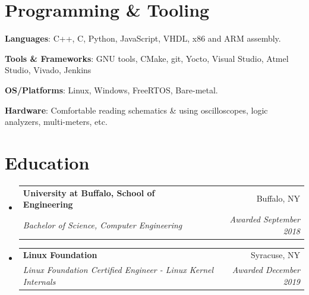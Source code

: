 \documentclass[letterpaper,11pt]{article}
\makeatletter
\newcommand{\resumeSubheading}[4]{
  \vspace{-1pt}\item
    \begin{tabular*}{0.97\textwidth}{l@{\extracolsep{\fill}}r}
      \textbf{#1} & #2 \\
      \textit{\small#3} & \textit{\small #4} \\
    \end{tabular*}\vspace{-5pt}
}
\newcommand{\resumeSubHeadingListStart}{\begin{itemize}[leftmargin=*]}
\newcommand{\resumeSubHeadingListEnd}{\end{itemize}}
\makeatother
\begin{document}
%
\section{Programming \& Tooling}
 \resumeSubHeadingListStart
   \item{
     \textbf{Languages}{: C++, C, Python, JavaScript, VHDL, x86 and ARM assembly.} }
     \hfill
     \item{
      \textbf{Tools \& Frameworks}{: GNU tools, CMake, git, Yocto, Visual Studio, Atmel Studio, Vivado, Jenkins
   } 
\item{
	\textbf{OS/Platforms}{: Linux, Windows, FreeRTOS, Bare-metal.} }
\item {
	\textbf{Hardware}{: Comfortable reading schematics \& using oscilloscopes, logic analyzers, multi-meters, etc.}}

} 
 \resumeSubHeadingListEnd
 
 \section{Education}
 \resumeSubHeadingListStart
 \resumeSubheading
 {University at Buffalo, School of Engineering}{Buffalo, NY}
 {Bachelor of Science, Computer Engineering}{Awarded September 2018}
  \resumeSubheading
 {Linux Foundation}{Syracuse, NY}
 {Linux Foundation Certified Engineer - Linux Kernel Internals}{Awarded December 2019}
 \resumeSubHeadingListEnd
 
 


\end{document}
